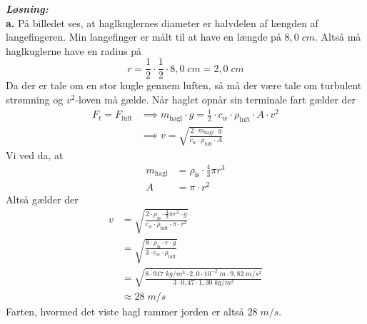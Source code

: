 \documentclass{report}
\newcommand{\sol}{\setlength{\parindent}{0cm}\textbf{\textit{Løsning:}}\setlength{\parindent}{1cm}}
\begin{document}
\sol \\
\textbf{a.}
På billedet ses, at haglkuglernes diameter er halvdelen af længden af langefingeren.
Min langefinger er målt til at have en længde på $8,0 \;\unit{cm} $.
Altså må haglkuglerne have en radius på
\[
r=\frac{1}{2} \cdot \frac{1}{2} \cdot 8,0 \;\unit{cm} =2,0 \;\unit{cm} 
\] 
Da der er tale om en stor kugle gennem luften, så må der være tale om turbulent strømning og $v^2$-loven må gælde.
Når haglet opnår sin terminale fart gælder der
\begin{equation*}
\begin{split}
  F_t=F_{\text{luft} } &\implies m_{\text{hagl} } \cdot g=\frac{1}{2} \cdot c_w \cdot \rho_{\text{luft} }\cdot A \cdot v^2\\
  &\implies v=\sqrt{\frac{2 \cdot m _{\text{hagl} } \cdot g}{c_w \cdot \rho_{\text{luft}}\cdot A }}
\end{split}
\end{equation*}
Vi ved da, at
\begin{equation*}
\begin{split}
  m _{\text{hagl} }&=\rho _{\text{is} }\cdot \frac{4}{3}\pi r^3\\
  A&=\pi \cdot r^2
\end{split}
\end{equation*}
Altså gælder der
\begin{equation*}
\begin{split}
  v&=\sqrt{\frac{2 \cdot \rho _{\text{is} }\cdot \frac{4}{3}\pi r^3 \cdot g}{c_w \cdot \rho_{\text{luft}}\cdot \pi \cdot r^2 }}\\
  &=\sqrt{\frac{8 \cdot \rho _{\text{is} } \cdot r \cdot g}{3 \cdot c_w \cdot \rho_{\text{luft}}}}\\
  &=\sqrt{\frac{8 \cdot 917 \;\unit{kg/m^3} \cdot 2,0 \cdot 10^{-2} \;\unit{m}  \cdot 9,82 \;\unit{m/s^2} }{3 \cdot 0,47 \cdot 1,30 \;\unit{kg/m^3} }}\\
  &\approx 28 \;\unit{m/s} 
\end{split}
\end{equation*}
Farten, hvormed det viste hagl rammer jorden er altså $28 \;\unit{m/s} $.
\end{document}
